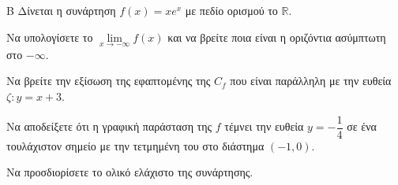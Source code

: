 \begin{thema}{Β}
Δίνεται η συνάρτηση $f(x) = x e^x$ με πεδίο ορισμού το $\mathbb{R}$.
\begin{erwthma}
\item Να υπολογίσετε το $\lim\limits_{x \to -\infty} f(x)$ και να βρείτε ποια είναι η οριζόντια ασύμπτωτη στο $-\infty$.
\item Να βρείτε την εξίσωση της εφαπτομένης της $C_f$ που είναι παράλληλη με την ευθεία $\zeta: y=x+3$.
\item Να αποδείξετε ότι η γραφική παράσταση της $f$ τέμνει την ευθεία $y = -\dfrac{1}{4}$ σε ένα τουλάχιστον σημείο με την τετμημένη του στο διάστημα $(-1, 0)$.
\item Να προσδιορίσετε το ολικό ελάχιστο της συνάρτησης.
\end{erwthma}
\end{thema}

